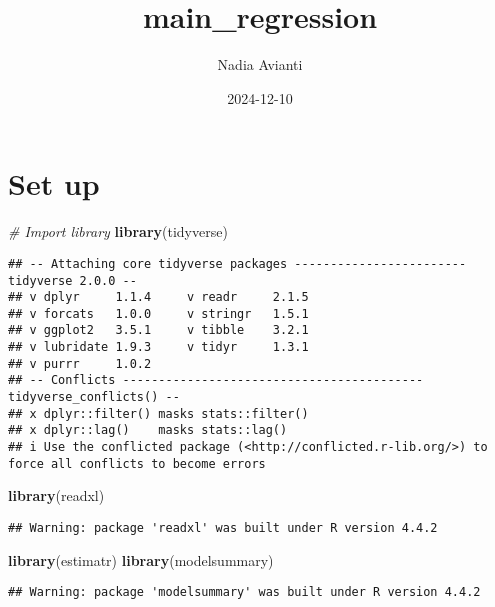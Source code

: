 \documentclass[
]{article}
\title{main\_regression}
\author{Nadia Avianti}
\date{2024-12-10}
\newenvironment{Shaded}{\begin{snugshade}}{\end{snugshade}}
\newcommand{\CommentTok}[1]{\textcolor[rgb]{0.56,0.35,0.01}{\textit{#1}}}
\newcommand{\FunctionTok}[1]{\textcolor[rgb]{0.13,0.29,0.53}{\textbf{#1}}}
\newcommand{\NormalTok}[1]{#1}
\begin{document}
\maketitle

\section{Set up}\label{set-up}

\begin{Shaded}
\begin{Highlighting}[]
\CommentTok{\# Import library}
\FunctionTok{library}\NormalTok{(tidyverse)}
\end{Highlighting}
\end{Shaded}

\begin{verbatim}
## -- Attaching core tidyverse packages ------------------------ tidyverse 2.0.0 --
## v dplyr     1.1.4     v readr     2.1.5
## v forcats   1.0.0     v stringr   1.5.1
## v ggplot2   3.5.1     v tibble    3.2.1
## v lubridate 1.9.3     v tidyr     1.3.1
## v purrr     1.0.2     
## -- Conflicts ------------------------------------------ tidyverse_conflicts() --
## x dplyr::filter() masks stats::filter()
## x dplyr::lag()    masks stats::lag()
## i Use the conflicted package (<http://conflicted.r-lib.org/>) to force all conflicts to become errors
\end{verbatim}

\begin{Shaded}
\begin{Highlighting}[]
\FunctionTok{library}\NormalTok{(readxl)}
\end{Highlighting}
\end{Shaded}

\begin{verbatim}
## Warning: package 'readxl' was built under R version 4.4.2
\end{verbatim}

\begin{Shaded}
\begin{Highlighting}[]
\FunctionTok{library}\NormalTok{(estimatr)}
\FunctionTok{library}\NormalTok{(modelsummary)}
\end{Highlighting}
\end{Shaded}

\begin{verbatim}
## Warning: package 'modelsummary' was built under R version 4.4.2
\end{verbatim}
\end{document}
